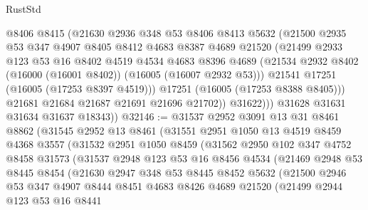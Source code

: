 \begin{lexlean}{RustStd}
\begin{coremodule}
                @8406
                @8415
                (@21630
                  @2936
                  @348
                  @53
                  @8406
                  @8413
                  @5632
                  (@21500
                    @2935
                    @53
                    @347
                    @4907
                    @8405
                    @8412
                    @4683
                    @8387
                    @4689
                    @21520
                    (@21499
                      @2933
                      @123
                      @53
                      @16
                      @8402
                      @4519
                      @4534
                      @4683
                      @8396
                      @4689
                      (@21534 @2932 @8402 (@16000 (@16001 @8402)) (@16005 (@16007 @2932 @53)))
                      @21541
                      @17251
                      (@16005 (@17253 @8397 @4519)))
                    @17251
                    (@16005 (@17253 @8388 @8405)))
                  @21681
                  @21684
                  @21687
                  @21691
                  @21696
                  @21702))
              @31622)))
        @31628
        @31631
        @31634
        @31637
        @18343))
@32146 := @31537
    @2952
    @3091
    @13
    @31
    @8461
    @8862
    (@31545
      @2952
      @13
      @8461
      (@31551
        @2951
        @1050
        @13
        @4519
        @8459
        @4368
        @3557
        (@31532
          @2951
          @1050
          @8459
          (@31562
            @2950
            @102
            @347
            @4752
            @8458
            @31573
            (@31537
              @2948
              @123
              @53
              @16
              @8456
              @4534
              (@21469
                @2948
                @53
                @8445
                @8454
                (@21630
                  @2947
                  @348
                  @53
                  @8445
                  @8452
                  @5632
                  (@21500
                    @2946
                    @53
                    @347
                    @4907
                    @8444
                    @8451
                    @4683
                    @8426
                    @4689
                    @21520
                    (@21499
                      @2944
                      @123
                      @53
                      @16
                      @8441

\end{coremodule}
\end{lexlean}

